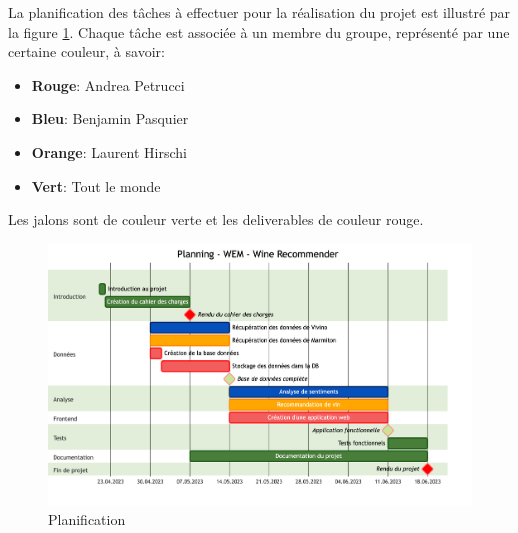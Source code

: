 La planification des tâches à effectuer pour la réalisation du projet est illustré par la figure \ref{fig:planning}. Chaque tâche est associée à un membre du groupe, représenté par une certaine couleur, à savoir:

\begin{itemize}
    \color{red}
    \item \textbf{Rouge}: \color{black}Andrea Petrucci
    \color{blue}
    \item  \textbf{Bleu}: \color{black}Benjamin Pasquier
    \color{orange}
    \item \textbf{Orange}: \color{black}Laurent Hirschi
    \color{teal}
    \item \textbf{Vert}: \color{black}Tout le monde
\end{itemize}

Les jalons sont de couleur 
\color{mygreen}verte \color{black} et les deliverables de couleur \color{red}rouge\color{black}.

\begin{figure}[H]
    \centering
    \includegraphics[width=1\textwidth]{rsc/planning.png}
    \caption{Planification}
    \label{fig:planning}
\end{figure}
